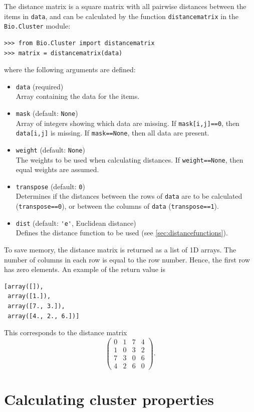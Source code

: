\documentclass{report}
\begin{document}
The distance matrix is a square matrix with all pairwise distances between the items in \verb|data|, and can be calculated by the function \verb|distancematrix| in the \verb|Bio.Cluster| module:
\begin{verbatim}
>>> from Bio.Cluster import distancematrix
>>> matrix = distancematrix(data)
\end{verbatim}
where the following arguments are defined:
\begin{itemize}
\item \verb|data| (required)\\
Array containing the data for the items.
\item \verb|mask| (default: \verb|None|) \\
Array of integers showing which data are missing. If \verb|mask[i,j]==0|, then \verb|data[i,j]| is missing. If \verb|mask==None|, then all data are present.
\item \verb|weight| (default: \verb|None|) \\
The weights to be used when calculating distances. If \verb|weight==None|, then equal weights are assumed.
\item \verb|transpose| (default: \verb|0|) \\
Determines if the distances between the rows of \verb|data| are to be calculated (\verb|transpose==0|), or between the columns of \verb|data| (\verb|transpose==1|).
\item \verb|dist| (default: \verb|'e'|, Euclidean distance) \\
Defines the distance function to be used (see \ref{sec:distancefunctions}).
\end{itemize}

To save memory, the distance matrix is returned as a list of 1D arrays.
The number of columns in each row is equal to the row number. Hence, the first row has zero elements. An example of the return value is
\begin{verbatim}
[array([]),
 array([1.]),
 array([7., 3.]),
 array([4., 2., 6.])]
\end{verbatim}
This corresponds to the distance matrix
$$
\left(
\begin{array}{cccc}
0 & 1 & 7 & 4  \\
1 & 0 & 3 & 2  \\
7 & 3 & 0 & 6  \\
4 & 2 & 6 & 0
\end{array}
\right).
$$

\section{Calculating cluster properties}
\end{document}

